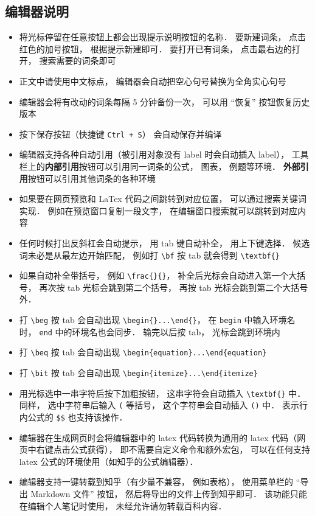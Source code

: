 \subsection{编辑器说明}
\begin{itemize}
\item 将光标停留在任意按钮上都会出现提示说明按钮的名称． 要新建词条， 点击红色的加号按钮， 根据提示新建即可． 要打开已有词条， 点击最右边的打开， 搜索需要的词条即可
\item 正文中请使用中文标点， 编辑器会自动把空心句号替换为全角实心句号
\item 编辑器会将有改动的词条每隔 5 分钟备份一次， 可以用 “恢复” 按钮恢复历史版本
\item 按下保存按钮（快捷键 \verb|Ctrl + S|） 会自动保存并编译
\item 编辑器支持各种自动引用（被引用对象没有 label 时会自动插入 label）， 工具栏上的\textbf{内部引用}按钮可以引用同一词条的公式， 图表， 例题等环境． \textbf{外部引用}按钮可以引用其他词条的各种环境
\item 如果要在网页预览和 LaTex 代码之间跳转到对应位置， 可以通过搜索关键词实现． 例如在预览窗口复制一段文字， 在编辑窗口搜索就可以跳转到对应内容
\item 任何时候打出反斜杠会自动提示， 用 tab 键自动补全， 用上下键选择． 候选词未必是从最左边开始匹配， 例如打 \verb|\bf| 按 tab 就会得到 \verb|\textbf{}|
\item 如果自动补全带括号， 例如 \verb|\frac{}{}|， 补全后光标会自动进入第一个大括号， 再次按 tab 光标会跳到第二个括号， 再按 tab 光标会跳到第二个大括号外．
\item 打 \verb|\beg| 按 tab 会自动出现 \verb|\begin{}...\end{}|， 在 \verb|begin| 中输入环境名时， \verb|end| 中的环境名也会同步． 输完以后按 tab， 光标会跳到环境内
\item 打 \verb|\beq| 按 tab 会自动出现 \verb|\begin{equation}...\end{equation}|
\item 打 \verb|\bit| 按 tab 会自动出现 \verb|\begin{itemize}...\end{itemize}|
\item 用光标选中一串字符后按下加粗按钮， 这串字符会自动插入 \verb|\textbf{}| 中． 同样， 选中字符串后输入 \verb|(| 等括号， 这个字符串会自动插入 \verb|()| 中． 表示行内公式的 \verb|$$| 也支持该操作．
\item 编辑器在生成网页时会将编辑器中的 latex 代码转换为通用的 latex 代码（网页中右键点击公式获得）， 即不需要自定义命令和额外宏包， 可以在任何支持 latex 公式的环境使用（如知乎的公式编辑器）．
\item 编辑器支持一键转载到知乎（有少量不兼容， 例如表格）， 使用菜单栏的 “导出 Markdown 文件” 按钮， 然后将导出的文件上传到知乎即可． 该功能只能在编辑个人笔记时使用， 未经允许请勿转载百科内容．
\end{itemize}

